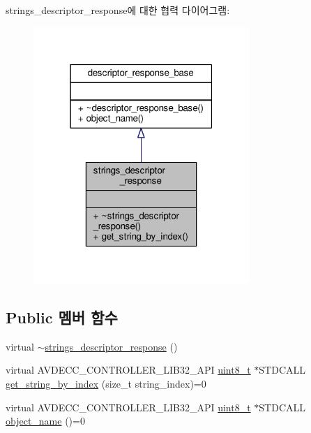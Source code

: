 strings\+\_\+descriptor\+\_\+response에 대한 협력 다이어그램\+:
\nopagebreak
\begin{figure}[H]
\begin{center}
\leavevmode
\includegraphics[width=232pt]{classavdecc__lib_1_1strings__descriptor__response__coll__graph}
\end{center}
\end{figure}
\subsection*{Public 멤버 함수}
\begin{DoxyCompactItemize}
\item 
virtual \hyperlink{classavdecc__lib_1_1strings__descriptor__response_a152c3ba264c45e97b9dcd2f246941a17}{$\sim$strings\+\_\+descriptor\+\_\+response} ()
\item 
virtual A\+V\+D\+E\+C\+C\+\_\+\+C\+O\+N\+T\+R\+O\+L\+L\+E\+R\+\_\+\+L\+I\+B32\+\_\+\+A\+PI \hyperlink{stdint_8h_aba7bc1797add20fe3efdf37ced1182c5}{uint8\+\_\+t} $\ast$S\+T\+D\+C\+A\+LL \hyperlink{classavdecc__lib_1_1strings__descriptor__response_ae8f3e50f4e5051488a864fd8acc6da31}{get\+\_\+string\+\_\+by\+\_\+index} (size\+\_\+t string\+\_\+index)=0
\item 
virtual A\+V\+D\+E\+C\+C\+\_\+\+C\+O\+N\+T\+R\+O\+L\+L\+E\+R\+\_\+\+L\+I\+B32\+\_\+\+A\+PI \hyperlink{stdint_8h_aba7bc1797add20fe3efdf37ced1182c5}{uint8\+\_\+t} $\ast$S\+T\+D\+C\+A\+LL \hyperlink{classavdecc__lib_1_1descriptor__response__base_a133f7774946d80f82b8aaaa4cfbb7361}{object\+\_\+name} ()=0
\end{DoxyCompactItemize}


